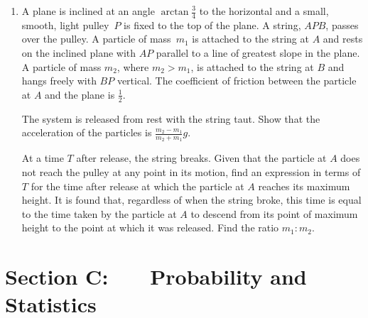 \documentclass[a4, 11pt]{report}
\newlength{\qspace}
\newcounter{qnumber}
\newenvironment{question}%
 {\vspace{\qspace}
  \begin{enumerate}[\bfseries 1\quad][10]%
    \setcounter{enumi}{\value{qnumber}}%
    \item%
 }
{
  \end{enumerate}
  \filbreak
  \stepcounter{qnumber}
 }
\newcommand{\ds}{\displaystyle}
\begin{document}
\begin{question}
A plane is   inclined at an 
angle $\arctan \frac34$ to the horizontal and 
 a small, smooth, light pulley~$P$ 
is fixed to the top of the  plane.  A string, $APB$, passes over the pulley.
A particle  of mass~$m_1$ 
is attached to  the string at $A$ and rests on the inclined plane with $AP$ 
parallel to a line of greatest slope in the plane. 
A particle of mass $m_2$, where $m_2>m_1$,
 is attached to the string at $B$ 
and hangs freely with $BP$ 
vertical. The coefficient of 
friction between the particle at $A$ 
and the plane is $ \frac{1}{2}$.  
 
The system is released from rest with the string taut. 
Show that the acceleration of the 
particles is $\ds \frac{m_2-m_1}{m_2+m_1}g$. 
 
At a time $T$ after release, the string breaks.
Given that the particle at $A$
does not reach the pulley at any point in its motion,
find an expression  in terms of $T$ for the time 
after release at which the particle at $A$ 
reaches its maximum height. It is found that, regardless 
of when the string broke, this time is equal to the time 
taken by the particle at $A$  to descend 
from its point of maximum height to the point 
at which it was released. Find the ratio $m_1 : m_2$.  

\end{question}
	

	
	\newpage
\section*{Section C: \ \ \ Probability and Statistics}
\end{document}
